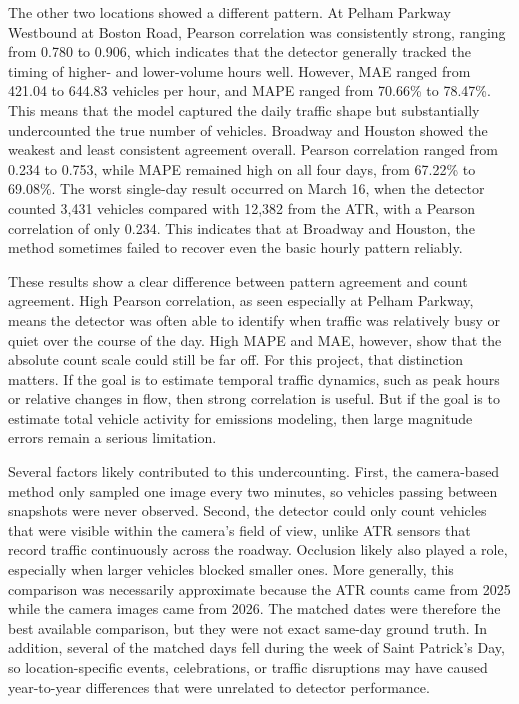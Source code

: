 The other two locations showed a different pattern. At Pelham Parkway Westbound 
at Boston Road, Pearson correlation was consistently strong, ranging from 0.780 to
0.906, which indicates that the detector generally tracked the timing of higher-
and lower-volume hours well. However, MAE ranged from 421.04 to 644.83 vehicles 
per hour, and MAPE ranged from 70.66\% to 78.47\%. This means that the model
captured the daily traffic shape but substantially undercounted the true number 
of vehicles. Broadway and Houston showed the weakest and least consistent agreement 
overall. Pearson correlation ranged from 0.234 to 0.753, while MAPE remained high 
on all four days, from 67.22\% to 69.08\%. The worst single-day result occurred 
on March 16, when the detector counted 3,431 vehicles compared with 12,382 from
the ATR, with a Pearson correlation of only 0.234. This indicates that at Broadway 
and Houston, the method sometimes failed to recover even the basic hourly pattern 
reliably.

These results show a clear difference between pattern agreement and count agreement.
High Pearson correlation, as seen especially at Pelham Parkway, means the detector 
was often able to identify when traffic was relatively busy or quiet over the course 
of the day. High MAPE and MAE, however, show that the absolute count scale could 
still be far off. For this project, that distinction matters. If the goal is to 
estimate temporal traffic dynamics, such as peak hours or relative changes in flow,
then strong correlation is useful. But if the goal is to estimate total vehicle 
activity for emissions modeling, then large magnitude errors remain a serious limitation.

Several factors likely contributed to this undercounting. First, the camera-based 
method only sampled one image every two minutes, so vehicles passing between snapshots 
were never observed. Second, the detector could only count vehicles that were visible 
within the camera's field of view, unlike ATR sensors that record traffic continuously
across the roadway. Occlusion likely also played a role, especially when larger vehicles
blocked smaller ones. More generally, this comparison was necessarily approximate 
because the ATR counts came from 2025 while the camera images came from 2026. The 
matched dates were therefore the best available comparison, but they were not exact
same-day ground truth. In addition, several of the matched days fell during the week
of Saint Patrick's Day, so location-specific events, celebrations, or traffic 
disruptions may have caused year-to-year differences that were unrelated to detector 
performance.

